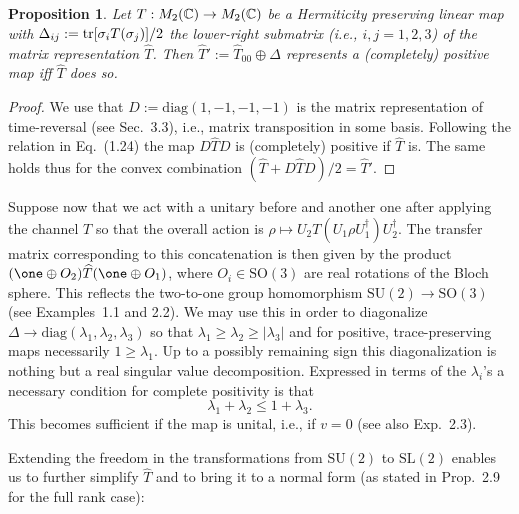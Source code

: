 \documentclass[11pt,a4paper]{article}
\numberwithin{equation}{section}
\theoremstyle{plain}
\newtheorem{proposition}{Proposition}[section]
\theoremstyle{definition}
\begin{document}
    \begin{proposition}
        Let $T:M_2(\mathbb{C})\to M_2(\mathbb{C})$ be a Hermiticity preserving linear map with
        $\Delta_{ij}:=\operatorname{tr}[\sigma_iT(\sigma_j)]/2$ the lower-right submatrix (i.e.,
        $i,j=1,2,3$) of the matrix representation $\widehat{T}$. Then
        $\widehat{T}' := \widehat{T}_{00} \oplus \Delta$ represents a (completely) positive
        map iff $\widehat{T}$ does so.
    \end{proposition}

    \begin{proof}
        We use that $D:=\mathrm{diag}(1,-1,-1,-1)$ is the matrix representation of
        time-reversal (see Sec.~3.3), i.e., matrix transposition in some basis. Following
        the relation in Eq.~(1.24) the map $D\widehat{T}D$ is (completely) positive if
        $\widehat{T}$ is. The same holds thus for the convex combination
        $(\widehat{T}+D\widehat{T}D)/2 = \widehat{T}'$.
    \end{proof}

    Suppose now that we act with a unitary before and another one after applying the
    channel $T$ so that the overall action is
$\rho \mapsto U_2T(U_1\rho U_1^\dagger)U_2^\dagger$.
    The transfer matrix corresponding to this concatenation is then given by the product
$(\one\oplus O_2)\widehat{T}(\one\oplus O_1)$, where $O_i\in \mathrm{SO}(3)$ are real
    rotations of the Bloch sphere. This reflects the two-to-one group homomorphism
$\mathrm{SU}(2)\to \mathrm{SO}(3)$ (see Examples~1.1 and 2.2). We may use this in
    order to diagonalize $\Delta \to \mathrm{diag}(\lambda_1,\lambda_2,\lambda_3)$ so that
$\lambda_1\ge \lambda_2\ge |\lambda_3|$ and for positive, trace-preserving maps
    necessarily $1\ge \lambda_1$. Up to a possibly remaining sign this diagonalization is
    nothing but a real singular value decomposition. Expressed in terms of the $\lambda_i$'s
    a necessary condition for complete positivity is that
    \begin{equation}\label{eq:2.40}
        \lambda_1 + \lambda_2 \le 1 + \lambda_3.
    \end{equation}
    This becomes sufficient if the map is unital, i.e., if $v=0$ (see also Exp.~2.3).

    Extending the freedom in the transformations from $\mathrm{SU}(2)$ to
$\mathrm{SL}(2)$ enables us to further simplify $\widehat{T}$ and to bring it to a
normal form (as stated in Prop.~2.9 for the full rank case):
\end{document}
